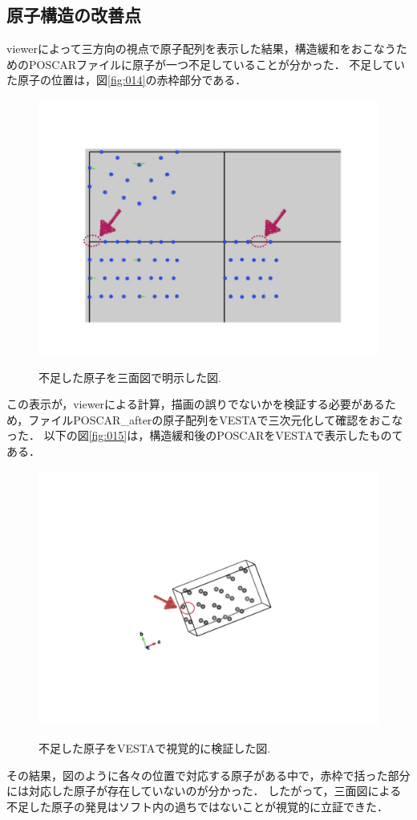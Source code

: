 \subsection{原子構造の改善点}
viewerによって三方向の視点で原子配列を表示した結果，構造緩和をおこなうためのPOSCARファイルに原子が一つ不足していることが分かった．
不足していた原子の位置は，図\ref{fig:014}の赤枠部分である．

\begin{figure}[htbp]\begin{center}
\includegraphics[width=12cm,bb= 0 0 937 753]{../figs/./boundary_narita.014.jpeg}
\caption{不足した原子を三面図で明示した図.}
\label{fig:014}
\label{default}\end{center}\end{figure}
この表示が，viewerによる計算，描画の誤りでないかを検証する必要があるため，ファイルPOSCAR\_afterの原子配列をVESTAで三次元化して確認をおこなった．
以下の図\ref{fig:015}は，構造緩和後のPOSCARをVESTAで表示したものてある．

\begin{figure}[htbp]\begin{center}
\includegraphics[width=12cm,bb= 0 0 937 753]{../figs/./boundary_narita.015.jpeg}
\caption{不足した原子をVESTAで視覚的に検証した図.}
\label{fig:015}
\label{default}\end{center}\end{figure}
その結果，図のように各々の位置で対応する原子がある中で，赤枠で括った部分には対応した原子が存在していないのが分かった．
したがって，三面図による不足した原子の発見はソフト内の過ちではないことが視覚的に立証できた．

